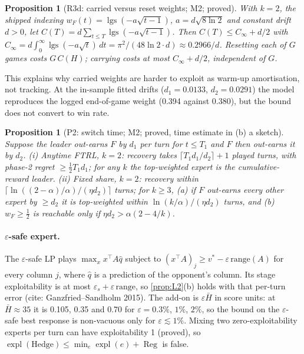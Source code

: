 \documentclass[10pt]{article}
\theoremstyle{plain}
\newtheorem{proposition}[theorem]{Proposition}
\theoremstyle{definition}
\theoremstyle{remark}
\DeclareMathOperator{\expl}{expl}
\DeclareMathOperator{\lgs}{lgs}
\DeclareMathOperator{\Reg}{Reg}
\newcommand{\epss}{\varepsilon_s}
\newcommand{\Hbar}{\bar H}
\newcommand{\qhat}{\hat q}
\begin{document}
\begin{proposition}[R3d: carried versus reset weights; M2; proved]\label{prop:R3d}
With $k=2$, the shipped indexing $w_F(t)=\lgs(-a\sqrt{t-1})$, $a=d\sqrt{8\ln2}$ and constant drift $d>0$, let
$C(T)=d\sum_{t\le T}\lgs(-a\sqrt{t-1})$. Then $C(T)\le C_\infty+d/2$ with
$C_\infty=d\int_0^\infty\lgs(-a\sqrt t)\,dt=\pi^2/(48\ln2\cdot d)\approx0.2966/d$. Resetting each of $G$ games costs
$G\,C(H)$; carrying costs at most $C_\infty+d/2$, independent of $G$.
\end{proposition}
This explains why carried weights are harder to exploit as warm-up amortisation, not tracking. At the in-sample fitted
drifts ($d_1=0.0133$, $d_2=0.0291$) the model reproduces the logged end-of-game weight (0.394 against 0.380), but the
bound does not convert to win rate.

\begin{proposition}[P2: switch time; M2; proved, time estimate in (b) a sketch]\label{prop:P2}
Suppose the leader out-earns $F$ by $d_1$ per turn for $t\le T_1$ and $F$ then out-earns it by $d_2$. (i) Anytime FTRL,
$k=2$: recovery takes $\lceil T_1d_1/d_2\rceil+1$ played turns, with phase-2 regret $\ge\tfrac12T_1d_1$; for any $k$ the
top-weighted expert is the cumulative-reward leader. (ii) Fixed share, $k=2$: recovery within
$\lceil\ln((2-\alpha)/\alpha)/(\eta d_2)\rceil$ turns; for $k\ge3$, (a) if $F$ out-earns every other expert by $\ge d_2$
it is top-weighted within $\ln(k/\alpha)/(\eta d_2)$ turns, and (b) $w_F\ge\tfrac12$ is reachable only if
$\eta d_2>\alpha(2-4/k)$.
\end{proposition}

\paragraph{$\varepsilon$-safe expert.} The $\varepsilon$-safe LP plays $\max_xx^\top A\qhat$ subject to
$(x^\top A)_j\ge v^*-\varepsilon\,\mathrm{range}(A)$ for every column $j$, where $\qhat$ is a prediction of the
opponent's column. Its stage exploitability is at most $\epss+\varepsilon\,\mathrm{range}$, so \cref{prop:L2}(b) holds with that
per-turn error (cite: Ganzfried--Sandholm 2015). The add-on is $\varepsilon\Hbar$ in score units: at $\Hbar\approx35$ it is 0.105,
0.35 and 0.70 for $\varepsilon=0.3\%$, $1\%$, $2\%$, so the bound on the $\varepsilon$-safe best response is non-vacuous only for $\varepsilon\lesssim1\%$.
Mixing two zero-exploitability experts per turn can have exploitability 1 (proved), so
$\expl(\text{Hedge})\le\min_e\expl(e)+\Reg$ is false.
\end{document}
